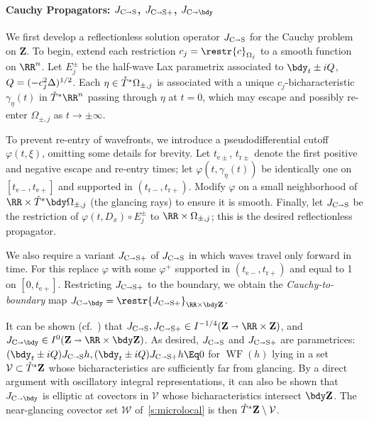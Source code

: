 \documentclass[10pt]{article}
\theoremstyle{plain}
\theoremstyle{definition}
\theoremstyle{remark}
\numberwithin{theorem}{section}
\numberwithin{example}{section}
\numberwithin{equation}{section}
\numberwithin{figure}{section}
\newcommand\sref[1]{\textsection\ref{#1}}					%
\newcommand\To{\smash{\mathring T}\vphantom{T}}			%
\let\d\bdy 						%
\DeclareMathOperator\WF{WF}		%
\newcommand\JCS{J_{\text C\shortrightarrow \text S}}		%
\newcommand\JCSp{J_{\text C\shortrightarrow \text S+}}	%
\newcommand\JCB{J_{\text C\shortrightarrow \bdy}}		%
\newcommand\eqml{\Eq}					%
\begin{document}
\paragraph{Cauchy Propagators: $\JCS$, $\JCSp$, $\JCB$}

We first develop a reflectionless solution operator $\JCS$ for the Cauchy problem on $\mathbf Z$. To begin, extend each restriction $c_j= \restr{c}_{\Omega_j}$ to a smooth function on $\RR^n$. Let $E^\pm_j$ be the half-wave Lax parametrix associated to $\d_t\pm iQ$, $Q=(-c_j^2\Delta)^{\smash{1/2}}$. Each $\eta\in \To^*\Omega_{\pm,j}$ is associated with a unique $c_j$-bicharacteristic $\gamma_\eta(t)$ in $\To^*\RR^n$ passing through $\eta$ at $t=0$, which may escape and possibly re-enter $\Omega_{\pm,j}$ as $t\to\pm\infty$.

To prevent re-entry of wavefronts, we introduce a pseudodifferential cutoff $\varphi(t,\xi)$, omitting some details for brevity. Let $t_{\mathrm e\pm}$, $t_{\mathrm r\pm}$ denote the first positive and negative escape and re-entry times; let $\varphi(t,\gamma_\eta(t))$ be identically one on $[t_{\mathrm e-},t_{\mathrm e+}]$ and supported in $(t_{\mathrm r-}, t_{\mathrm r+})$. Modify $\varphi$ on a small neighborhood of $\RR\times\To^*\bdy\Omega_{\pm,j}$ (the glancing rays) to ensure it is smooth. Finally, let $\JCS$ be the restriction of $\varphi(t,D_x)\circ E^\pm_j$ to $\RR\times\Omega_{\pm,j}$; this is the desired reflectionless propagator.

We also require a variant $\JCSp$ of $\JCS$ in which waves travel only forward in time. For this replace $\varphi$ with some $\varphi^+$ supported in $(t_{\mathrm e-}, t_{\mathrm r+})$ and equal to 1 on $[0,t_{\mathrm e+}]$. Restricting $\JCSp$ to the boundary, we obtain the \emph{Cauchy-to-boundary} map $\JCB=\restr{\JCSp}^{\phantom+}_{\RR\times\bdy\mathbf Z}$.

It can be shown (cf.~\cite{Chazarain}) that $\JCS,\JCSp\in I^{-1/4}(\mathbf Z\shortrightarrow \RR\times \mathbf Z)$, and $\JCB\in I^0(\mathbf Z\shortrightarrow\RR\times\bdy\mathbf Z)$. As desired, $\JCS$ and $\JCSp$ are parametrices: $(\d_t\pm iQ)\JCS h,(\d_t\pm iQ)\JCSp h\eqml 0$ for $\WF(h)$ lying in a set $\mathcal V\subset\To^*\mathbf Z$ whose bicharacteristics are sufficiently far from glancing. By a direct argument with oscillatory integral representations, it can also be shown that $\JCB$ is elliptic at covectors in $\mathcal V$ whose bicharacteristics intersect $\bdy\mathbf Z$. The near-glancing covector set $\mathcal W$ of~\sref{s:microlocal} is then $\To^*\mathbf Z\setminus\mathcal V$.
\end{document}
